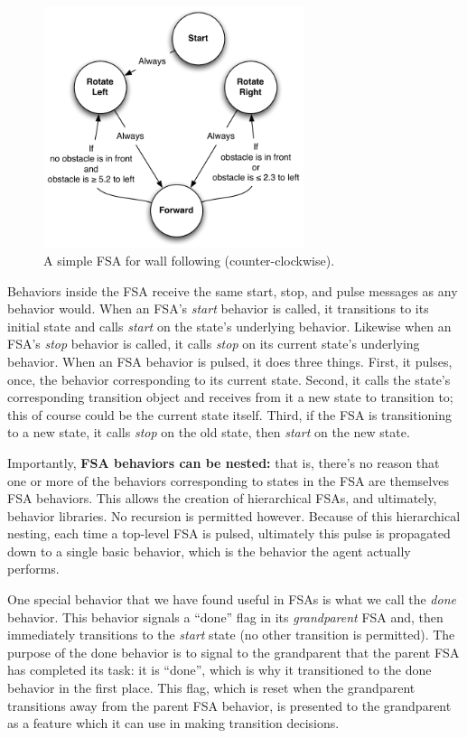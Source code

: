 \documentclass[11pt]{article}
\begin{document}
\begin{figure}
\includegraphics[width=3in]{WallFollower.pdf}
\caption{A simple FSA for wall following (counter-clockwise).}
\label{fsa}
\end{figure}


Behaviors inside the FSA receive the same start, stop, and pulse messages as any behavior would.  When an FSA's {\it start} behavior is called, it transitions to its initial state and calls {\it start} on the state's underlying behavior.  Likewise when an FSA's {\it stop} behavior is called, it calls {\it stop} on its current state's underlying behavior.  When an FSA behavior is pulsed, it does three things.  First, it pulses, once, the behavior corresponding to its current state.  Second, it calls the state's corresponding transition object and receives from it a new state to transition to; this of course could be the current state itself.  Third, if the FSA is transitioning to a new state, it calls {\it stop} on the old state, then {\it start} on the new state.

Importantly, {\bf FSA behaviors can be nested:} that is, there's no reason that one or more of the behaviors corresponding to states in the FSA are themselves FSA behaviors.  This allows the creation of hierarchical FSAs, and ultimately, behavior libraries.  No recursion is permitted however.  Because of this hierarchical nesting, each time a top-level FSA is pulsed, ultimately this pulse is propagated down to a single basic behavior, which is the behavior the agent actually performs.

One special behavior that we have found useful in FSAs is what we call the {\it done} behavior.  This behavior signals a ``done'' flag in its {\it grandparent} FSA and, then immediately transitions to the {\it start} state (no other transition is permitted).  The purpose of the done behavior is to signal to the grandparent that the parent FSA has completed its task: it is ``done'', which is why it transitioned to the done behavior in the first place.  This flag, which is reset when the grandparent transitions away from the parent FSA behavior, is presented to the grandparent as a feature which it can use in making transition decisions.
\end{document}
